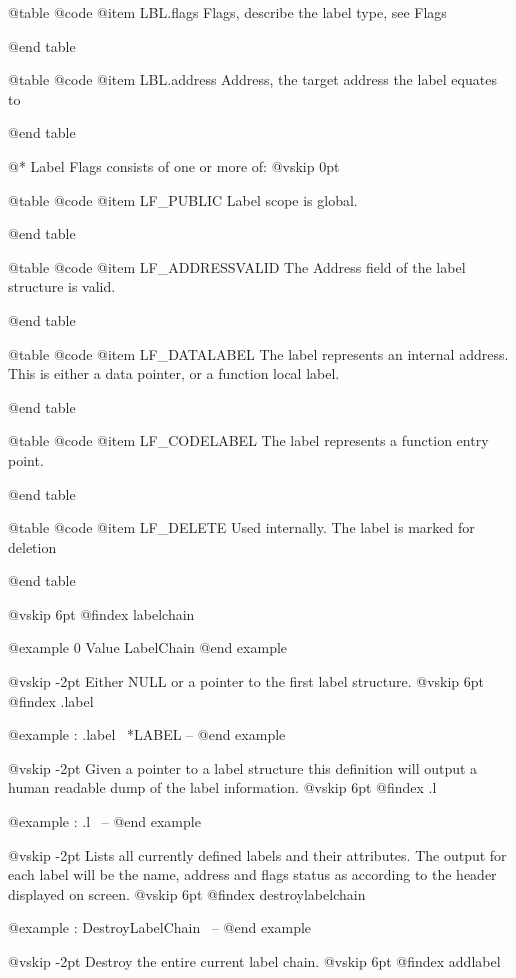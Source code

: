 @table @code
@item LBL.flags
Flags, describe the label type, see Flags

@end table



@table @code
@item LBL.address
Address, the target address the label equates to

@end table

@*
Label Flags consists of one or more of:
@vskip 0pt


@table @code
@item LF_PUBLIC
Label scope is global.

@end table



@table @code
@item LF_ADDRESSVALID
The Address field of the label structure is valid.

@end table



@table @code
@item LF_DATALABEL
The label represents an internal address. This
 is either a data pointer, or a function local label.

@end table



@table @code
@item LF_CODELABEL
The label represents a function entry point.

@end table



@table @code
@item LF_DELETE
Used internally. The label is marked for deletion

@end table

@vskip 6pt
@findex labelchain

@example
0 Value LabelChain @end example

@vskip -2pt
Either NULL or a pointer to the first label structure.
@vskip 6pt
@findex .label

@example
: .label                \ *LABEL -- @end example

@vskip -2pt
Given a pointer to a label structure this definition will output
a human readable dump of the label information.
@vskip 6pt
@findex .l

@example
: .l                    \ -- @end example

@vskip -2pt
Lists all currently defined labels and their attributes. The
output for each label will be the name, address and flags status as
according to the header displayed on screen.
@vskip 6pt
@findex destroylabelchain

@example
: DestroyLabelChain     \ -- @end example

@vskip -2pt
Destroy the entire current label chain.
@vskip 6pt
@findex addlabel

